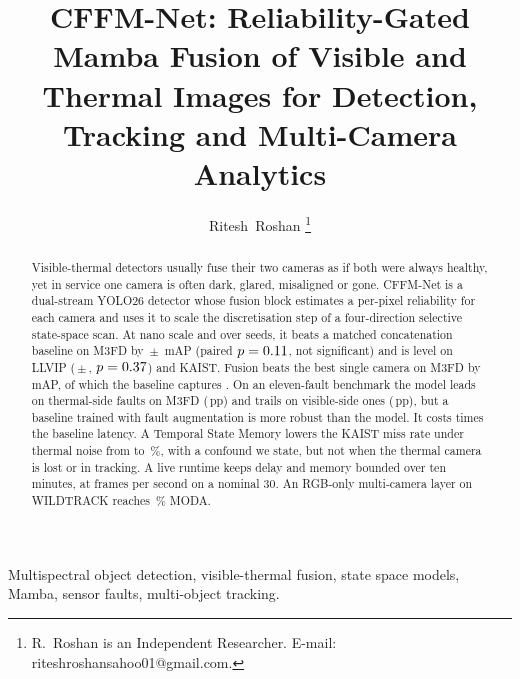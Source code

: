 \documentclass[journal]{IEEEtran}
\begin{document}
\title{CFFM-Net: Reliability-Gated Mamba Fusion of Visible and Thermal Images for Detection, Tracking and Multi-Camera Analytics}
\author{Ritesh~Roshan%
\thanks{R.~Roshan is an Independent Researcher. E-mail: riteshroshansahoo01@gmail.com.}}
\maketitle

\begin{abstract}
Visible-thermal detectors usually fuse their two cameras as if both were always healthy, yet in service one camera is often dark, glared, misaligned or gone. CFFM-Net is a dual-stream YOLO26 detector whose fusion block estimates a per-pixel reliability for each camera and uses it to scale the discretisation step of a four-direction selective state-space scan. At nano scale and over \resLlvipCffmVtwoSeedCount{} seeds, it beats a matched concatenation baseline on M3FD by \marMfdVtwoVsConcatMdMeanMap{}\,$\pm$\,\marMfdVtwoVsConcatMdStdMap{} mAP (paired $p=0.11{}$, not significant) and is level on LLVIP (\marLlvipVtwoVsConcatMdMeanMap{}\,$\pm$\,\marLlvipVtwoVsConcatMdStdMap{}, $p=0.37{}$) and KAIST. Fusion beats the best single camera on M3FD by \gainMfdCffmVtwoOverBestMeanMap{}\,mAP, of which the baseline captures \gainMfdConcatMdOverBestMeanMap{}. On an eleven-fault benchmark the model leads on thermal-side faults on M3FD (\fltMfdMarginMeanThermalAvgSevThreeMap{}\,pp) and trails on visible-side ones (\fltMfdMarginMeanVisibleAvgSevThreeMap{}\,pp), but a baseline trained with fault augmentation is more robust than the model. It costs \latLocalRatioMedian{} times the baseline latency. A Temporal State Memory lowers the KAIST miss rate under thermal noise from \memThermalNoiseImageAllMr{} to \memThermalNoiseMemoryAllMr{}\,\%, with a confound we state, but not when the thermal camera is lost or in tracking. A live runtime keeps delay and memory bounded over ten minutes, at \livSoakThirtyFps{} frames per second on a nominal 30. An RGB-only multi-camera layer on WILDTRACK reaches \camDetFineTunedModa\,\% MODA.
\end{abstract}

\begin{IEEEkeywords}
Multispectral object detection, visible-thermal fusion, state space models, Mamba, sensor faults, multi-object tracking.
\end{IEEEkeywords}
\end{document}
